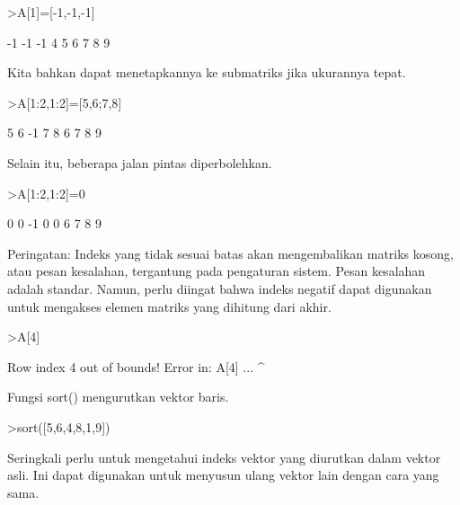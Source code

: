 \documentclass[a4paper,10pt]{article}
\begin{document}
\begin{eulernotebook}
\begin{eulercomment}
\begin{eulercomment}
\begin{eulercomment}
\begin{eulercomment}
\begin{eulercomment}
\begin{eulercomment}
\begin{eulercomment}
\end{eulercomment}
\begin{eulerprompt}
>A[1]=[-1,-1,-1]
\end{eulerprompt}
\begin{euleroutput}
             -1            -1            -1 
              4             5             6 
              7             8             9 
\end{euleroutput}
\begin{eulercomment}
Kita bahkan dapat menetapkannya ke submatriks jika ukurannya tepat.
\end{eulercomment}
\begin{eulerprompt}
>A[1:2,1:2]=[5,6;7,8]
\end{eulerprompt}
\begin{euleroutput}
              5             6            -1 
              7             8             6 
              7             8             9 
\end{euleroutput}
\begin{eulercomment}
Selain itu, beberapa jalan pintas diperbolehkan.
\end{eulercomment}
\begin{eulerprompt}
>A[1:2,1:2]=0
\end{eulerprompt}
\begin{euleroutput}
              0             0            -1 
              0             0             6 
              7             8             9 
\end{euleroutput}
\begin{eulercomment}
Peringatan: Indeks yang tidak sesuai batas akan mengembalikan matriks
kosong, atau pesan kesalahan, tergantung pada pengaturan sistem. Pesan
kesalahan adalah standar. Namun, perlu diingat bahwa indeks negatif
dapat digunakan untuk mengakses elemen matriks yang dihitung dari
akhir.
\end{eulercomment}
\begin{eulerprompt}
>A[4]
\end{eulerprompt}
\begin{euleroutput}
  Row index 4 out of bounds!
  Error in:
  A[4] ...
      ^
\end{euleroutput}
\begin{eulercomment}
Fungsi sort() mengurutkan vektor baris.
\end{eulercomment}
\begin{eulerprompt}
>sort([5,6,4,8,1,9])
\end{eulerprompt}
\begin{euleroutput}
  [1,  4,  5,  6,  8,  9]
\end{euleroutput}
\begin{eulercomment}
Seringkali perlu untuk mengetahui indeks vektor yang diurutkan dalam
vektor asli. Ini dapat digunakan untuk menyusun ulang vektor lain
dengan cara yang sama.


\end{eulercomment}
\end{eulercomment}
\end{eulercomment}
\end{eulercomment}
\end{eulercomment}
\end{eulercomment}
\end{eulercomment}
\end{eulernotebook}
\end{document}
